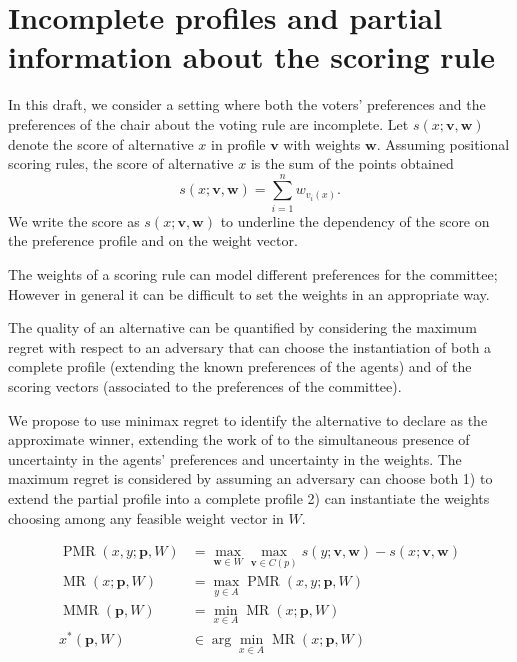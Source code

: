 \documentclass[12pt]{article}
\newcommand{\rank}{v}
\newcommand{\profile}{\textbf{v}}%
\newcommand{\pprofile}{\textbf{p}}%
\newcommand{\w}{\textbf{w}}%
\DeclareMathOperator{\PMR}{PMR}
\DeclareMathOperator{\MR}{MR}
\DeclareMathOperator{\MMR}{MMR}
\begin{document}
\section{Incomplete profiles and partial information about the scoring rule}
In this draft, we consider a setting where both the voters' preferences and the preferences of the chair about the voting rule are incomplete.
Let $s(x;\profile,\w)$ denote the score of alternative $x$ in profile $\profile$ with weights $\w$.
Assuming positional scoring rules, the score of alternative $x$ is the sum of the points obtained 
\[ s(x;\profile,\w) = \sum_{i=1}^{n} w_{\rank_i(x)}. \]
We write the score as $s(x;\profile,\textbf{w})$ to underline the dependency of the score on the preference profile and on the weight vector. 

The weights of a scoring rule can model different preferences for the committee; However in general it can be difficult to set the weights in an appropriate way.


The quality of an alternative can be quantified by considering the maximum regret with respect to an adversary that can choose the instantiation of both a complete profile (extending the known preferences of the agents) and of the scoring vectors (associated to the preferences of the committee).


We propose to use minimax regret to identify the alternative to declare as the approximate winner, extending the work of \cite{Lu2011} to the simultaneous presence of uncertainty in the agents' preferences and uncertainty in the weights.
The maximum regret is considered by assuming an adversary can choose both 1) to extend the partial profile into a complete profile 2) can instantiate the weights choosing among any feasible weight vector in $W$.

\begin{align*}
\PMR(x,y; \pprofile, W) &= \max_{\w \in W} \max_{\profile \in C(p)} s(y; \profile,\w) - s(x; \profile,\w)\\
\MR(x; \pprofile, W) &= \max_{y \in A} \PMR(x,y; \pprofile, W) \\
\MMR(\pprofile,W) & = \min_{x \in A} \MR(x;\pprofile,W) \\
x^{*}(\pprofile,W) & \in \arg\min_{x \in A} \MR(x;\pprofile,W) 
\end{align*}
\end{document}
